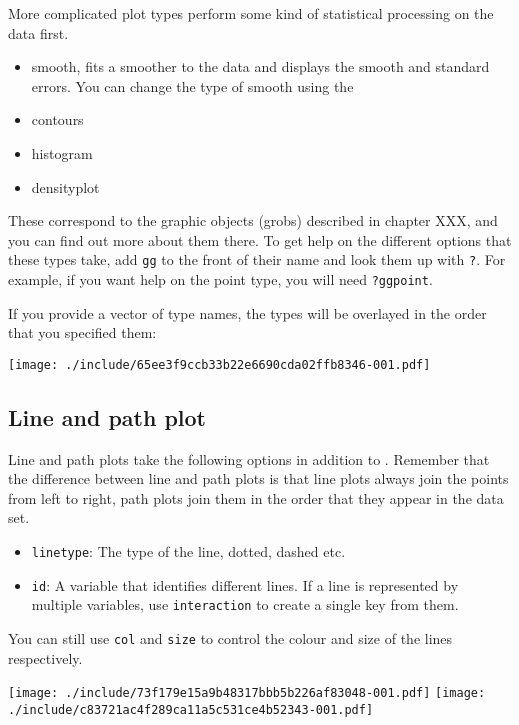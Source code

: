 More complicated plot types perform some kind of statistical processing on the data first.

\begin{itemize}
	\item smooth, fits a smoother to the data and displays the smooth and standard errors.  You can change the type of smooth using the 
	\item contours
	\item histogram
	\item densityplot
\end{itemize}

These correspond to the graphic objects (grobs) described in chapter XXX, and you can find out more about them there.  To get help on the different options that these types take, add {\tt gg} to the front of their name and look them up with {\tt ?}. For example, if you want help on the point type, you will need {\tt ?ggpoint}. 

If you provide a vector of type names, the types will be overlayed in the order that you specified them:

\texttt{[image: ./include/65ee3f9ccb33b22e6690cda02ffb8346-001.pdf]}


\subsection{Line and path plot}\label{sub:line_plot}

Line and path plots take the following options in addition to .  Remember that the difference between line and path plots is that line plots always join the points from left to right, path plots join them in the order that they appear in the data set.

\begin{itemize}
	\item {\tt linetype}: The type of the line, dotted, dashed etc.
	\item {\tt id}: A variable that identifies different lines.  If a line is represented by multiple variables, use {\tt interaction} to create a single key from them.
\end{itemize}

You can still use {\tt col} and {\tt size} to control the colour and size of the lines respectively.

\texttt{[image: ./include/73f179e15a9b48317bbb5b226af83048-001.pdf]}
\texttt{[image: ./include/c83721ac4f289ca11a5c531ce4b52343-001.pdf]}

